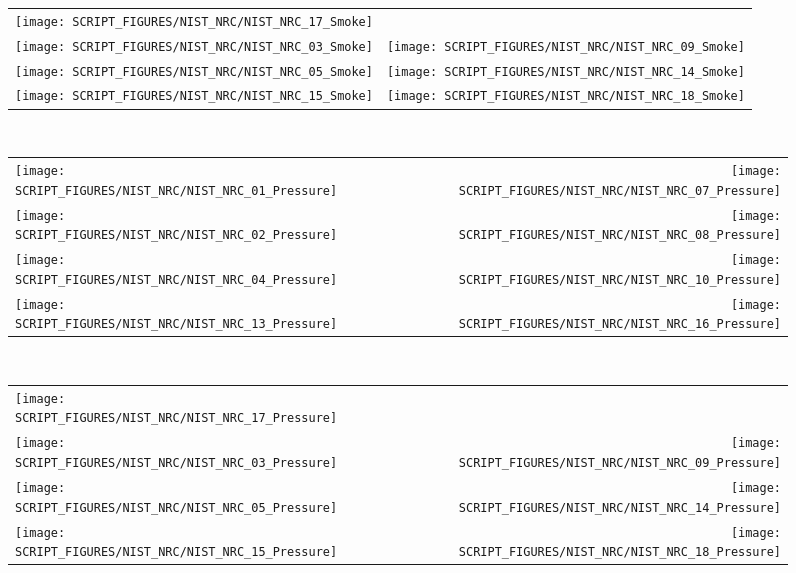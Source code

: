 \begin{figure}[p]
\begin{tabular*}{\textwidth}{l@{\extracolsep{\fill}}r}
\texttt{[image: SCRIPT\_FIGURES/NIST\_NRC/NIST\_NRC\_17\_Smoke]} & \\
\texttt{[image: SCRIPT\_FIGURES/NIST\_NRC/NIST\_NRC\_03\_Smoke]} &
\texttt{[image: SCRIPT\_FIGURES/NIST\_NRC/NIST\_NRC\_09\_Smoke]} \\
\texttt{[image: SCRIPT\_FIGURES/NIST\_NRC/NIST\_NRC\_05\_Smoke]} &
\texttt{[image: SCRIPT\_FIGURES/NIST\_NRC/NIST\_NRC\_14\_Smoke]} \\
\texttt{[image: SCRIPT\_FIGURES/NIST\_NRC/NIST\_NRC\_15\_Smoke]} &
\texttt{[image: SCRIPT\_FIGURES/NIST\_NRC/NIST\_NRC\_18\_Smoke]}
\end{tabular*}\
\label{NIST_NRC_Smoke_Open}
\end{figure}

\clearpage

\begin{figure}[p]
\begin{tabular*}{\textwidth}{l@{\extracolsep{\fill}}r}
\texttt{[image: SCRIPT\_FIGURES/NIST\_NRC/NIST\_NRC\_01\_Pressure]} &
\texttt{[image: SCRIPT\_FIGURES/NIST\_NRC/NIST\_NRC\_07\_Pressure]} \\
\texttt{[image: SCRIPT\_FIGURES/NIST\_NRC/NIST\_NRC\_02\_Pressure]} &
\texttt{[image: SCRIPT\_FIGURES/NIST\_NRC/NIST\_NRC\_08\_Pressure]} \\
\texttt{[image: SCRIPT\_FIGURES/NIST\_NRC/NIST\_NRC\_04\_Pressure]} &
\texttt{[image: SCRIPT\_FIGURES/NIST\_NRC/NIST\_NRC\_10\_Pressure]} \\
\texttt{[image: SCRIPT\_FIGURES/NIST\_NRC/NIST\_NRC\_13\_Pressure]} &
\texttt{[image: SCRIPT\_FIGURES/NIST\_NRC/NIST\_NRC\_16\_Pressure]}
\end{tabular*}\
\label{NIST_NRC_Pressure_Closed}
\end{figure}

\begin{figure}[p]
\begin{tabular*}{\textwidth}{l@{\extracolsep{\fill}}r}
\texttt{[image: SCRIPT\_FIGURES/NIST\_NRC/NIST\_NRC\_17\_Pressure]} &
   \\
\texttt{[image: SCRIPT\_FIGURES/NIST\_NRC/NIST\_NRC\_03\_Pressure]} &
\texttt{[image: SCRIPT\_FIGURES/NIST\_NRC/NIST\_NRC\_09\_Pressure]} \\
\texttt{[image: SCRIPT\_FIGURES/NIST\_NRC/NIST\_NRC\_05\_Pressure]} &
\texttt{[image: SCRIPT\_FIGURES/NIST\_NRC/NIST\_NRC\_14\_Pressure]} \\
\texttt{[image: SCRIPT\_FIGURES/NIST\_NRC/NIST\_NRC\_15\_Pressure]} &
\texttt{[image: SCRIPT\_FIGURES/NIST\_NRC/NIST\_NRC\_18\_Pressure]}
\end{tabular*}
\label{NIST_NRC_Pressure_Open}
\end{figure}

